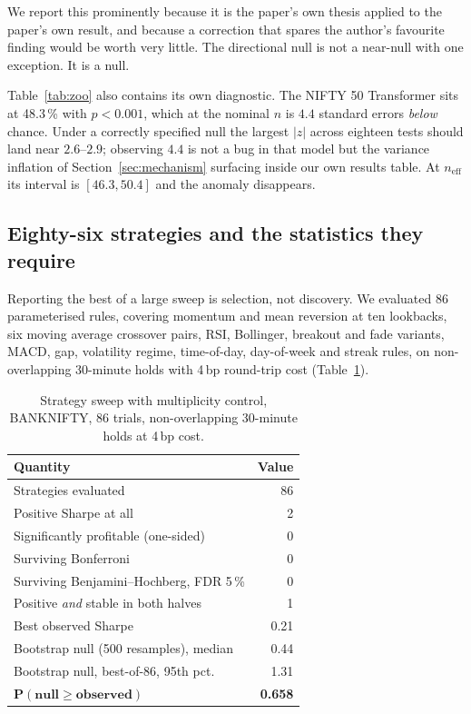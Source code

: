 \documentclass[conference]{IEEEtran}
\begin{document}
We report this prominently because it is the paper's own thesis applied to the
paper's own result, and because a correction that spares the author's favourite
finding would be worth very little. The directional null is not a near-null with
one exception. It is a null.

Table~\ref{tab:zoo} also contains its own diagnostic. The NIFTY 50 Transformer
sits at 48.3\,\% with $p<0.001$, which at the nominal $n$ is $4.4$ standard
errors \emph{below} chance. Under a correctly specified null the largest
$|z|$ across eighteen tests should land near $2.6$--$2.9$; observing $4.4$ is
not a bug in that model but the variance inflation of
Section~\ref{sec:mechanism} surfacing inside our own results table. At
$n_{\text{eff}}$ its interval is $[46.3, 50.4]$ and the anomaly disappears.

\subsection{Eighty-six strategies and the statistics they require}

Reporting the best of a large sweep is selection, not discovery. We evaluated 86
parameterised rules, covering momentum and mean reversion at ten lookbacks, six
moving average crossover pairs, RSI, Bollinger, breakout and fade variants,
MACD, gap, volatility regime, time-of-day, day-of-week and streak rules, on
non-overlapping 30-minute holds with 4\,bp round-trip cost
(Table~\ref{tab:sweep}).

\begin{table}[!tb]
\caption{Strategy sweep with multiplicity control, BANKNIFTY, 86 trials,
non-overlapping 30-minute holds at 4\,bp cost.}
\label{tab:sweep}
\centering
\footnotesize
\setlength{\tabcolsep}{4pt}
\begin{tabular}{@{}lr@{}}
\toprule
\textbf{Quantity} & \textbf{Value} \\
\midrule
Strategies evaluated & 86 \\
Positive Sharpe at all & 2 \\
Significantly profitable (one-sided) & 0 \\
Surviving Bonferroni & 0 \\
Surviving Benjamini--Hochberg, FDR 5\,\% & 0 \\
Positive \emph{and} stable in both halves & 1 \\
\midrule
Best observed Sharpe & 0.21 \\
Bootstrap null (500 resamples), median & 0.44 \\
Bootstrap null, best-of-86, 95th pct. & 1.31 \\
$\boldsymbol{P(\text{null} \geq \text{observed})}$ & \textbf{0.658} \\
\bottomrule
\end{tabular}
\end{table}
\end{document}
